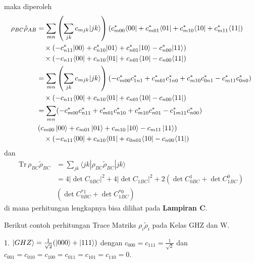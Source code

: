 maka diperoleh
\begin{equation}
	\begin{aligned}
		\rho_{BC} \tilde{\rho}_{AB}
		&= \sum_{m n}
		\left(
		\sum_{j k} c_{m j k} | j k \rangle
		\right)
		\left(
		c^{*}_{m00} \langle 00|
		+ c^{*}_{m01} \langle 01|
		+ c^{*}_{m10} \langle 10|
		+ c^{*}_{m11} \langle 11|
		\right) \\
		&\quad \times
		\left(
		- c^{*}_{n11} |00\rangle
		+ c^{*}_{n10} |01\rangle
		+ c^{*}_{n01} |10\rangle
		- c^{*}_{n00} |11\rangle
		\right) \\
		&\quad \times
		\left(
		- c_{n11} \langle 00|
		+ c_{n10} \langle 01|
		+ c_{n01} \langle 10|
		- c_{n00} \langle 11|
		\right)\\
		&= \sum_{m n}
		\left(
		\sum_{j k} c_{m j k} | j k \rangle
		\right)
		\left(
		- c^{*}_{m00} c^{*}_{1n1}
		+ c^{*}_{m01} c^{*}_{1n0}
		+ c^{*}_{m10} c^{*}_{0n1}
		- c^{*}_{m11} c^{*}_{0n0}
		\right) \\
		&\quad \times
		\left(
		- c_{n11} \langle 00|
		+ c_{n10} \langle 01|
		+ c_{n01} \langle 10|
		- c_{n00} \langle 11|
		\right)\\
		&= \sum_{m n}
		(- c^{*}_{m00} c^{*}_{n11}
		+ c^{*}_{m01} c^{*}_{n10}
		+ c^{*}_{m10} c^{*}_{n01}
		- c^{*}_{1m11} c^{*}_{n00})\\
		&\left(
		c_{m00} \ket{00}
		+ c_{m01} \ket{01}
		+ c_{m10} \ket{10}
		- c_{m11} \ket{11}
		\right) \\
		&\quad \times
		\left(
		- c_{n11} \langle 00|
		+ c_{n10} \langle 01|
		+ c_{0n01} \langle 10|
		- c_{n00} \langle 11|
		\right)
	\end{aligned}
\end{equation}
dan
\begin{equation}
	\begin{aligned}
		\mathrm{Tr}\,\rho_{BC} \tilde{\rho}_{BC}
		&= \sum_{j k}
		\langle j k |
		\rho_{BC} \tilde{\rho}_{BC}
		| j k \rangle \\
		&= 4 |\det C_{0BC}|^2
		+ 4 |\det C_{1BC}|^2
		+ 2 (\det C_{0BC}^1 + \det C_{1BC}^0)\\
		&(\det C^{*1}_{0BC} + \det C^{*0}_{1BC})
	\end{aligned}
\end{equation}
di mana perhitungan lengkapnya bisa dilihat pada \textbf{Lampiran C}.
\par
Berikut contoh perhitungan Trace Matriks $\rho_i\tilde{\rho}_i$ pada Kelas GHZ dan W.

1. {$\ket{GHZ}=\frac{1}{\sqrt{2}}(\ket{000}+\ket{111})$}
dengan $c_{000}=c_{111}=\frac{1}{\sqrt{2}}$ dan $c_{001}=c_{010}=c_{100}=c_{011}=c_{101}=c_{110}=0$.

